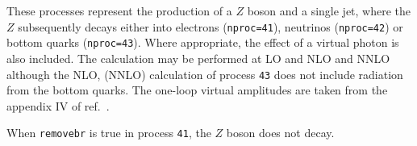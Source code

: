 \label{subsec:zjet}

These processes represent the production of a $Z$ boson and a single jet,
where the $Z$ subsequently
decays either into electrons ({\tt nproc=41}), neutrinos ({\tt nproc=42})
or bottom quarks ({\tt nproc=43}). Where appropriate, the effect of a virtual
photon is also included. The calculation may be performed at LO and NLO and NNLO\cite{Neumann:2022lft}
although the NLO, (NNLO) calculation of process {\tt 43} does not include radiation
from the bottom quarks.
The one-loop virtual amplitudes are taken from the appendix IV of ref.~\cite{Bern:1997sc}.

When {\tt removebr} is true in process {\tt 41}, the $Z$ boson does not decay.
